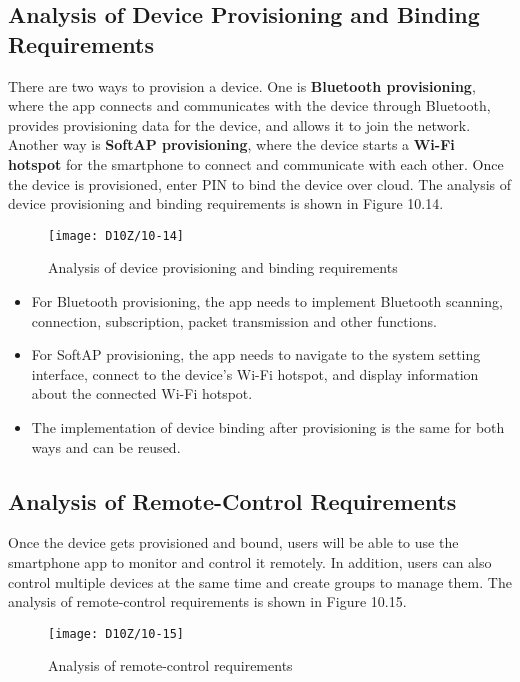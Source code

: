 \documentclass[a4paper,12pt]{book}
\begin{document}
\subsection{Analysis of Device Provisioning and Binding Requirements}
There are two ways to provision a device. One is \textbf{Bluetooth provisioning}, where the app connects and communicates with the device through Bluetooth, provides provisioning data for the device, and allows it to join the network. Another way is \textbf{SoftAP provisioning}, where the device starts a \textbf{Wi-Fi hotspot} for the smartphone to connect and communicate with each other. Once the device is provisioned, enter PIN to bind the device over cloud. The analysis of device provisioning and binding requirements is shown in Figure 10.14.

\begin{figure}[ht]
    \centering
    \texttt{[image: D10Z/10-14]}
    \caption{Analysis of device provisioning and binding requirements}
\end{figure}

\begin{itemize}
    \item For Bluetooth provisioning, the app needs to implement Bluetooth scanning, connection, subscription, packet transmission and other functions.
    \item For SoftAP provisioning, the app needs to navigate to the system setting interface, connect to the device’s Wi-Fi hotspot, and display information about the connected Wi-Fi hotspot.
    \item The implementation of device binding after provisioning is the same for both ways and can be reused.
\end{itemize}

\subsection{Analysis of Remote-Control Requirements}
Once the device gets provisioned and bound, users will be able to use the smartphone app to monitor and control it remotely. In addition, users can also control multiple devices at the same time and create groups to manage them. The analysis of remote-control requirements is shown in Figure 10.15.

\begin{figure}[ht]
    \centering
    \texttt{[image: D10Z/10-15]}
    \caption{Analysis of remote-control requirements}
\end{figure}
\end{document}
